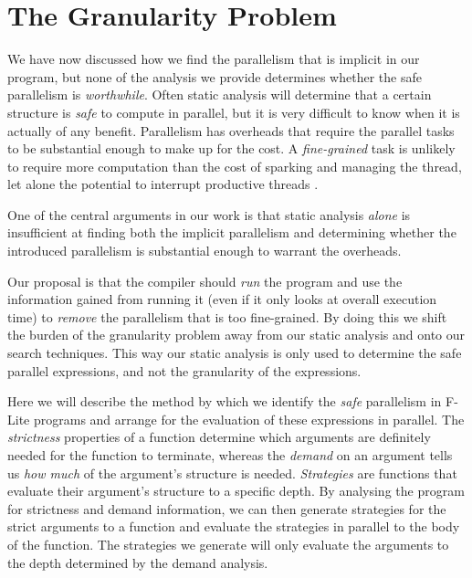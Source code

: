 \section{The Granularity Problem}

We have now discussed how we find the parallelism that is implicit in our
program, but none of the analysis we provide determines whether the safe
parallelism is \emph{worthwhile}. Often static analysis will determine that a
certain structure is \emph{safe} to compute in parallel, but it is very
difficult to know when it is actually of any benefit. Parallelism has overheads
that require the parallel tasks to be substantial enough to make up for the
cost. A \emph{fine-grained} task is unlikely to require more computation than
the cost of sparking and managing the thread, let alone the potential to
interrupt productive threads \citep{hammond2000research, hogen1992automatic}.

One of the central arguments in our work is that static analysis \emph{alone}
is insufficient at finding both the implicit parallelism and determining whether
the introduced parallelism is substantial enough to warrant the overheads.

Our proposal is that the compiler should \emph{run} the program and use the
information gained from running it (even if it only looks at overall execution
time) to \emph{remove} the parallelism that is too fine-grained. By doing this
we shift the burden of the granularity problem away from our static analysis
and onto our search techniques. This way our static analysis is only used to
determine the safe parallel expressions, and not the granularity of the
expressions.

Here we will describe the method by which we identify the \emph{safe}
parallelism in F-Lite programs and arrange for the evaluation of these
expressions in parallel. The \emph{strictness} properties of a function
determine which arguments are definitely needed for the function to terminate,
whereas the \emph{demand} on an argument tells us \emph{how much} of the
argument's structure is needed. \emph{Strategies} are functions that evaluate
their argument's structure to a specific depth. By analysing the program for
strictness and demand information, we can then generate strategies for the
strict arguments to a function and evaluate the strategies in parallel to the
body of the function. The strategies we generate will only evaluate the
arguments to the depth determined by the demand analysis.
